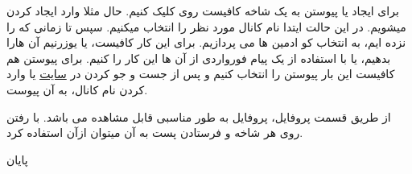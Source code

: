 \documentclass[oneside]{article}
\begin{document}
برای ایجاد یا پیوستن به یک شاخه کافیست روی  کلیک کنیم.
حال مثلا وارد ایجاد کردن میشویم. در این حالت ایتدا نام کانال مورد نظر را انتخاب میکنیم. سپس تا زمانی که  را نزده ایم، به انتخاب کو ادمین ها می پردازیم. برای این کار کافیست، یا یوزرنیم آن هارا بدهیم، یا با استفاده از یک پیام فورواردی از آن ها این کار را کنیم.
برای پیوستن هم کافیست این بار پیوستن را انتخاب کنیم و پس از جست و جو کردن در 
\href{http://telegramadminpro.ml/channel_manager}{سایت}
 یا وارد کردن نام کانال، به آن پیوست.
 
 از طریق قسمت پروفایل، پروفایل به طور مناسبی قابل مشاهده می باشد. با رفتن روی هر شاخه و فرستادن پست به آن میتوان ازآن استفاده کرد.
 
\centering 
 پایان
\end{document}
